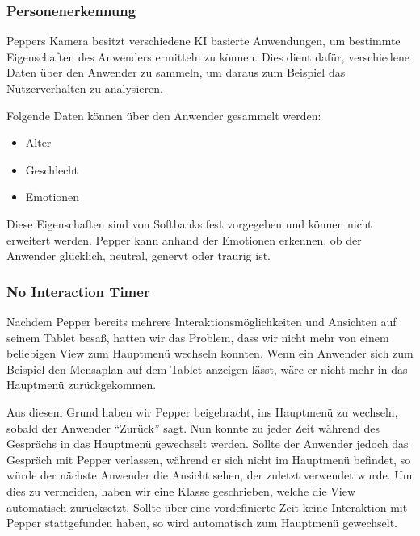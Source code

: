 \subsubsection{Personenerkennung}

Peppers Kamera besitzt verschiedene KI basierte Anwendungen, um bestimmte Eigenschaften des Anwenders ermitteln zu können. Dies dient dafür, verschiedene Daten über den Anwender zu sammeln, um daraus zum Beispiel das Nutzerverhalten zu analysieren.

Folgende Daten können über den Anwender gesammelt werden:
\begin{itemize}
    \item Alter
    \item Geschlecht
    \item Emotionen
\end{itemize}

Diese Eigenschaften sind von Softbanks fest vorgegeben und können nicht erweitert werden. Pepper kann anhand der Emotionen erkennen, ob der Anwender glücklich, neutral, genervt oder traurig ist.\\

\subsubsection{No Interaction Timer}

Nachdem Pepper bereits mehrere Interaktionsmöglichkeiten und Ansichten auf seinem Tablet besaß, hatten wir das Problem, dass wir nicht mehr von einem beliebigen View zum Hauptmenü wechseln konnten. Wenn ein Anwender sich zum Beispiel den Mensaplan auf dem Tablet anzeigen lässt, wäre er nicht mehr in das Hauptmenü zurückgekommen. 

Aus diesem Grund haben wir Pepper beigebracht, ins Hauptmenü zu wechseln, sobald der Anwender ``Zurück'' sagt. Nun konnte zu jeder Zeit während des Gesprächs in das Hauptmenü gewechselt werden. Sollte der Anwender jedoch das Gespräch mit Pepper verlassen, während er sich nicht im Hauptmenü befindet, so würde der nächste Anwender die Ansicht sehen, der zuletzt verwendet wurde. 
Um dies zu vermeiden, haben wir eine Klasse geschrieben, welche die View automatisch zurücksetzt.
Sollte über eine vordefinierte Zeit keine Interaktion mit Pepper stattgefunden haben, so wird automatisch zum Hauptmenü gewechselt.